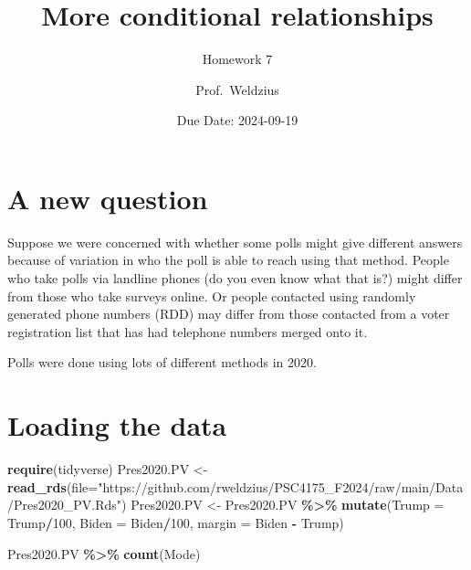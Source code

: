 \documentclass[
]{article}
\title{More conditional relationships}
\subtitle{Homework 7}
\author{Prof.~Weldzius}
\date{Due Date: 2024-09-19}
\newenvironment{Shaded}{\begin{snugshade}}{\end{snugshade}}
\newcommand{\AttributeTok}[1]{\textcolor[rgb]{0.13,0.29,0.53}{#1}}
\newcommand{\DecValTok}[1]{\textcolor[rgb]{0.00,0.00,0.81}{#1}}
\newcommand{\FunctionTok}[1]{\textcolor[rgb]{0.13,0.29,0.53}{\textbf{#1}}}
\newcommand{\NormalTok}[1]{#1}
\newcommand{\OtherTok}[1]{\textcolor[rgb]{0.56,0.35,0.01}{#1}}
\newcommand{\SpecialCharTok}[1]{\textcolor[rgb]{0.81,0.36,0.00}{\textbf{#1}}}
\newcommand{\StringTok}[1]{\textcolor[rgb]{0.31,0.60,0.02}{#1}}
\begin{document}
\maketitle

\section{A new question}\label{a-new-question}

Suppose we were concerned with whether some polls might give different
answers because of variation in who the poll is able to reach using that
method. People who take polls via landline phones (do you even know what
that is?) might differ from those who take surveys online. Or people
contacted using randomly generated phone numbers (RDD) may differ from
those contacted from a voter registration list that has had telephone
numbers merged onto it.

Polls were done using lots of different methods in 2020.

\section{Loading the data}\label{loading-the-data}

\begin{Shaded}
\begin{Highlighting}[]
\FunctionTok{require}\NormalTok{(tidyverse)}
\NormalTok{Pres2020.PV }\OtherTok{\textless{}{-}} \FunctionTok{read\_rds}\NormalTok{(}\AttributeTok{file=}\StringTok{"https://github.com/rweldzius/PSC4175\_F2024/raw/main/Data/Pres2020\_PV.Rds"}\NormalTok{)}
\NormalTok{Pres2020.PV }\OtherTok{\textless{}{-}}\NormalTok{ Pres2020.PV }\SpecialCharTok{\%\textgreater{}\%}
                \FunctionTok{mutate}\NormalTok{(}\AttributeTok{Trump =}\NormalTok{ Trump}\SpecialCharTok{/}\DecValTok{100}\NormalTok{,}
                      \AttributeTok{Biden =}\NormalTok{ Biden}\SpecialCharTok{/}\DecValTok{100}\NormalTok{,}
                      \AttributeTok{margin =}\NormalTok{ Biden }\SpecialCharTok{{-}}\NormalTok{ Trump)}
\end{Highlighting}
\end{Shaded}

\begin{Shaded}
\begin{Highlighting}[]
\NormalTok{Pres2020.PV }\SpecialCharTok{\%\textgreater{}\%}
  \FunctionTok{count}\NormalTok{(Mode)}
\end{Highlighting}
\end{Shaded}
\end{document}
